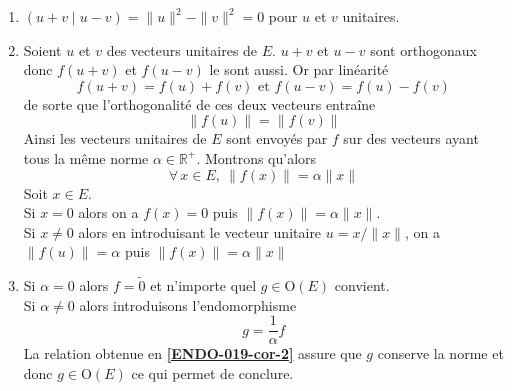 \begin{enumerate}
\item $(u+v \mid u-v)=\|u\|^2-\|v\|^2=0$ pour $u$ et $v$ unitaires.
\item\label{ENDO-019-cor-2} Soient $u$ et $v$ des vecteurs unitaires de $E$.
$u+v$ et $u-v$ sont orthogonaux donc $f(u+v)$ et $f(u-v)$ le sont aussi.
Or par linéarité
$$
f(u+v)=f(u)+f(v) \text { et } f(u-v)=f(u)-f(v)$$
de sorte que l'orthogonalité de ces deux vecteurs entraîne
$$
\|f(u)\|=\|f(v)\|
$$
Ainsi les vecteurs unitaires de $E$ sont envoyés par $f$ sur des vecteurs ayant tous la même norme $\alpha \in \mathbb{R}^{+}$.
Montrons qu'alors
$$
\forall\, x \in E,\ \|f(x)\|=\alpha\|x\|
$$
Soit $x \in E$.\\
Si $x=0$ alors on a $f(x)=0$ puis $\|f(x)\|=\alpha\|x\|$.\\
Si $x \neq 0$ alors en introduisant le vecteur unitaire $u=x /\|x\|$, on a $\|f(u)\|=\alpha$ puis $\|f(x)\|=\alpha\|x\|$
\item Si $\alpha=0$ alors $f=\tilde{0}$ et n'importe quel $g \in \mathrm{O}(E)$ convient.\\
Si $\alpha \neq 0$ alors introduisons l'endomorphisme
$$
g=\frac{1}{\alpha} f
$$
La relation obtenue en \textbf{\ref{ENDO-019-cor-2}} assure que $g$ conserve la norme et donc $g \in \mathrm{O}(E)$ ce qui permet de conclure.                                                                                                                    \end{enumerate}

